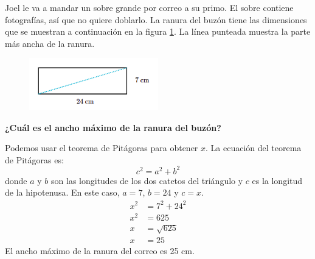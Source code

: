 Joel le va a mandar un sobre grande por correo a su primo. El sobre contiene fotografías, así que no quiere doblarlo.
La ranura del buzón tiene las dimensiones que se muestran a continuación en la figura \ref{fig:proverb_pitagoras_02}. La línea punteada muestra la parte más ancha de la ranura.
\begin{figure}[H]
    \begin{center}
        \includegraphics[width=0.5\textwidth]{../images/proverb_pitagoras_02.png}
    \end{center}
    \caption{}
    \label{fig:proverb_pitagoras_02}
\end{figure}
\textbf{¿Cuál es el ancho máximo de la ranura del buzón?}\\


\begin{solutionbox}{10cm}
    Podemos usar el teorema de Pitágoras para obtener $x$.
    La ecuación del teorema de Pitágoras es:
    \[c^2=a^2+b^2\]
    donde $a$ y $b$ son las longitudes de los dos catetos del triángulo y $c$ es la longitud de la hipotenusa.
    En este caso, $a=7$, $b=24$ y $c=x$.
    \begin{align*}
        x^2 & =7^2+24^2   \\
        x^2 & =625        \\
        x   & =\sqrt{625} \\
        x   & =25
    \end{align*}
    El ancho máximo de la ranura del correo es 25 cm.
\end{solutionbox}